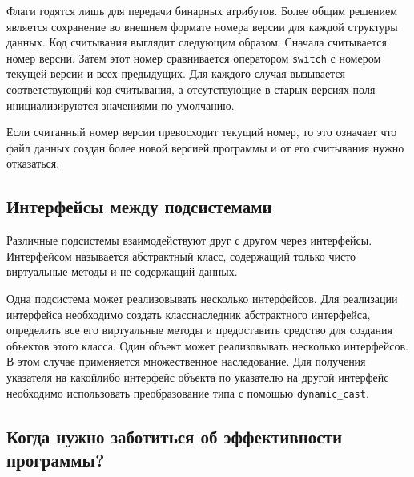 Флаги годятся лишь для передачи бинарных атрибутов. Более общим решением является сохранение во внешнем формате номера версии для каждой структуры данных. Код считывания выглядит следующим образом. Сначала считывается номер версии. Затем этот номер сравнивается оператором \lstinline|switch| с номером текущей версии и всех предыдущих. Для каждого случая вызывается соответствующий код считывания, а отсутствующие в старых версиях поля инициализируются значениями по умолчанию.

Если считанный номер версии превосходит текущий номер, то это означает что файл данных создан более новой версией программы и от его считывания нужно отказаться.

\newpage
\subsection{Интерфейсы между подсистемами}

Различные подсистемы взаимодействуют друг с другом через интерфейсы. Интерфейсом называется абстрактный класс, содержащий только чисто виртуальные методы и не содержащий данных.


Одна подсистема может реализовывать несколько интерфейсов. Для реализации интерфейса необходимо создать класс\mdash наследник абстрактного интерфейса, определить все его виртуальные методы и предоставить средство для создания объектов этого класса. Один объект может реализовывать несколько интерфейсов. В этом случае применяется множественное наследование. Для получения указателя на какой\sdash либо интерфейс объекта по указателю на другой интерфейс необходимо использовать преобразование типа с помощью \lstinline|dynamic_cast|.


\subsection{Когда нужно заботиться об эффективности программы?}

